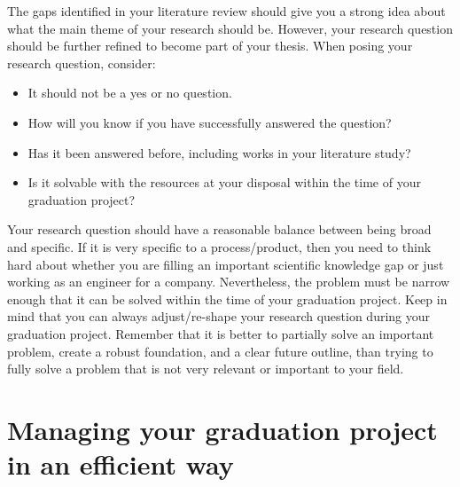 \documentclass{article}
\begin{document}
The gaps identified in your literature review should give you a strong idea about what the main theme of your research should be. However, your research question should be further refined to become part of your thesis. When posing your research question, consider:
\begin{itemize}
    \item It should not be a yes or no question.
    \item	How will you know if you have successfully answered the question?
    \item	Has it been answered before, including works in your literature study?
    \item	Is it solvable with the resources at your disposal within the time of your graduation project?
\end{itemize}

Your research question should have a reasonable balance between being broad and specific. If it is very specific to a process/product, then you need to think hard about whether you are filling an important scientific knowledge gap or just working as an engineer for a company. Nevertheless, the problem must be narrow enough that it can be solved within the time of your graduation project. Keep in mind that you can always adjust/re-shape your research question during your graduation project. Remember that it is better to partially solve an important problem, create a robust foundation, and a clear future outline, than trying to fully solve a problem that is not very relevant or important to your field. 

\section{Managing your graduation project in an efficient way}
\end{document}
